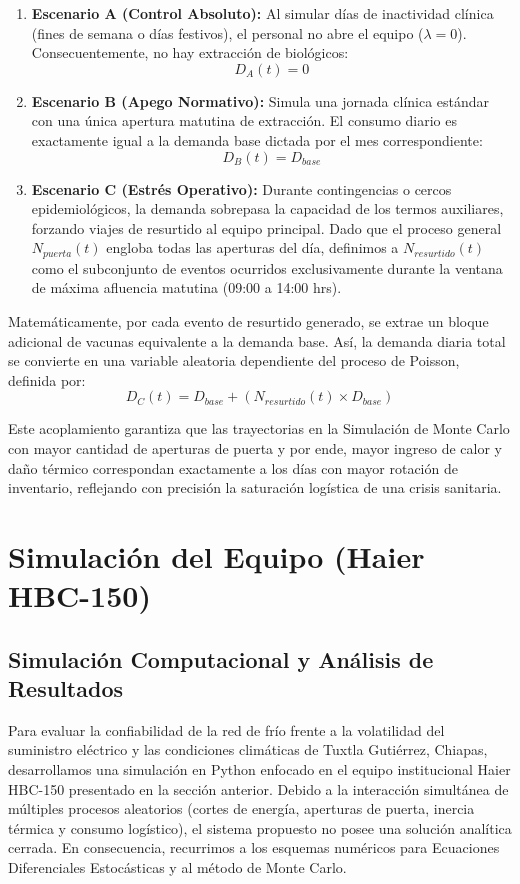 \documentclass[
  spanish,
  us-letterpaper,
]{scrreprt}
\providecommand{\tightlist}{%
  \setlength{\itemsep}{0pt}\setlength{\parskip}{0pt}}
\numberwithin{equation}{section}
\theoremstyle{plain}
\theoremstyle{plain}
\theoremstyle{definition}
\theoremstyle{plain}
\theoremstyle{remark}
\begin{document}
\begin{enumerate}
\def\labelenumi{\arabic{enumi}.}
\tightlist
\item
  \textbf{Escenario A (Control Absoluto):} Al simular días de
  inactividad clínica (fines de semana o días festivos), el personal no
  abre el equipo (\(\lambda = 0\)). Consecuentemente, no hay extracción
  de biológicos: \[D_A(t) = 0\]
\item
  \textbf{Escenario B (Apego Normativo):} Simula una jornada clínica
  estándar con una única apertura matutina de extracción. El consumo
  diario es exactamente igual a la demanda base dictada por el mes
  correspondiente: \[D_B(t) = D_{base}\]
\item
  \textbf{Escenario C (Estrés Operativo):} Durante contingencias o
  cercos epidemiológicos, la demanda sobrepasa la capacidad de los
  termos auxiliares, forzando viajes de resurtido al equipo principal.
  Dado que el proceso general \(N_{puerta}(t)\) engloba todas las
  aperturas del día, definimos a \(N_{resurtido}(t)\) como el
  subconjunto de eventos ocurridos exclusivamente durante la ventana de
  máxima afluencia matutina (09:00 a 14:00 hrs).
\end{enumerate}

Matemáticamente, por cada evento de resurtido generado, se extrae un
bloque adicional de vacunas equivalente a la demanda base. Así, la
demanda diaria total se convierte en una variable aleatoria dependiente
del proceso de Poisson, definida por:
\[D_C(t) = D_{base} + \left( N_{resurtido}(t) \times D_{base} \right)\]

Este acoplamiento garantiza que las trayectorias en la Simulación de
Monte Carlo con mayor cantidad de aperturas de puerta y por ende, mayor
ingreso de calor y daño térmico correspondan exactamente a los días con
mayor rotación de inventario, reflejando con precisión la saturación
logística de una crisis sanitaria.

\part{Simulación del Equipo (Haier HBC-150)}

\chapter{Simulación Computacional y Análisis de
Resultados}\label{sec-simulacion-computacional}

Para evaluar la confiabilidad de la red de frío frente a la volatilidad
del suministro eléctrico y las condiciones climáticas de Tuxtla
Gutiérrez, Chiapas, desarrollamos una simulación en Python enfocado en
el equipo institucional Haier HBC-150 presentado en la sección anterior.
Debido a la interacción simultánea de múltiples procesos aleatorios
(cortes de energía, aperturas de puerta, inercia térmica y consumo
logístico), el sistema propuesto no posee una solución analítica
cerrada. En consecuencia, recurrimos a los esquemas numéricos para
Ecuaciones Diferenciales Estocásticas y al método de Monte Carlo.
\end{document}
